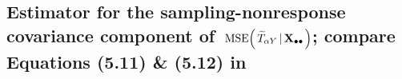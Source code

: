


\clearpage
\subsection{Estimator for the sampling-nonresponse covariance component of
\,$\textnormal{MSE}\!\left(\,\widetilde{T}_{\alpha Y}\left\vert\,\mathbf{X}_{\bullet\bullet}\right.\right)$;
compare Equations (5.11) \& (5.12) in \cite{Beaumont2011}}
\setcounter{theorem}{0}



